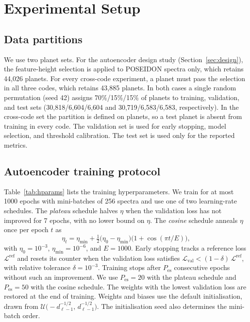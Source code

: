 \section{Experimental Setup}
\label{sec:setup}

\subsection{Data partitions}
\label{sec:splits}

We use two planet sets.
For the autoencoder design study (Section~\ref{sec:design}), the feature-height selection is applied to POSEIDON spectra only, which retains 44{,}026 planets.
For every cross-code experiment, a planet must pass the selection in all three codes, which retains 43{,}885 planets.
In both cases a single random permutation (seed 42) assigns 70\%/15\%/15\% of planets to training, validation, and test sets (30{,}818/6{,}604/6{,}604 and 30{,}719/6{,}583/6{,}583, respectively).
In the cross-code set the partition is defined on planets, so a test planet is absent from training in every code.
The validation set is used for early stopping, model selection, and threshold calibration.
The test set is used only for the reported metrics.

\subsection{Autoencoder training protocol}
\label{sec:aetrain}

Table~\ref{tab:hparams} lists the training hyperparameters.
We train for at most 1000 epochs with mini-batches of 256 spectra and use one of two learning-rate schedules.
The \emph{plateau} schedule halves $\eta$ when the validation loss has not improved for 7 epochs, with no lower bound on $\eta$.
The \emph{cosine} schedule anneals $\eta$ once per epoch $t$ as
\begin{equation}
  \eta_t = \eta_{\min} + \tfrac{1}{2}\bigl(\eta_0-\eta_{\min}\bigr)\bigl(1+\cos(\pi t/E)\bigr),
  \label{eq:cosine}
\end{equation}
with $\eta_0=10^{-3}$, $\eta_{\min}=10^{-6}$, and $E=1000$.
Early stopping tracks a reference loss $\mathcal{L}^{\mathrm{ref}}$ and resets its counter when the validation loss satisfies $\mathcal{L}_{\mathrm{val}}<(1-\delta)\,\mathcal{L}^{\mathrm{ref}}$, with relative tolerance $\delta=10^{-3}$.
Training stops after $P_{\mathrm{es}}$ consecutive epochs without such an improvement.
We use $P_{\mathrm{es}}=20$ with the plateau schedule and $P_{\mathrm{es}}=50$ with the cosine schedule.
The weights with the lowest validation loss are restored at the end of training.
Weights and biases use the default initialisation, drawn from $\mathcal{U}\bigl(-d_{\ell-1}^{-1/2},\,d_{\ell-1}^{-1/2}\bigr)$.
The initialisation seed also determines the mini-batch order.

